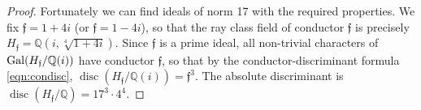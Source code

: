 \documentclass[smallextended]{svjour3}
\newcommand{\Q}{\mathbb{Q}}
\newcommand{\Z}{\mathbb{Z}}
\newcommand{\C}{\mathbb{C}}
\newcommand{\G}{{\rm Gal}}
\DeclareMathOperator{\disc}{disc}
\begin{document}
\begin{proof}
Fortunately we can find ideals of norm 17 with the required properties. 
We fix $\mathfrak f = 1+4i$ (or $\mathfrak f=1-4i$), 
so that the ray class field of conductor $\mathfrak f$ is precisely $H_{\mathfrak f} = \Q(i, \sqrt[4]{1+4i})$. 
Since $\mathfrak f$ is a prime ideal, all non-trivial characters of $\G(H_{\mathfrak f}/\Q(i))$ have conductor $\mathfrak f$, so that by the conductor-discriminant formula \eqref{eqn:condisc}, $\disc(H_{\mathfrak f}/\Q(i)) = \mathfrak f^3$. The absolute discriminant is $\disc(H_{\mathfrak f}/\Q) = 17^3\cdot 4^4$. 


\end{proof}
\end{document}
